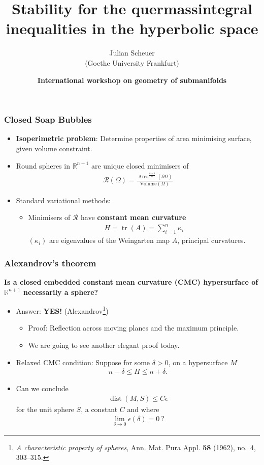 \documentclass{beamer}
\title[Stability for quermassintegrals]{Stability for the quermassintegral inequalities in the hyperbolic space}
\author[J. Scheuer]{Julian Scheuer\\ (Goethe University Frankfurt)
}
\date[Istanbul, 06/11/23]{{\bf{International workshop on geometry of submanifolds}}}
\newcommand{\bbR}{\mathbb{R}}
\newcommand{\8}{\infty}
\newcommand{\de}{\delta}
\newcommand{\ep}{\epsilon}
\newcommand{\ka}{\kappa}
\newcommand{\Om}{\Omega}
\newcommand{\cR}{\mathcal{R}}
\newcommand{\del}{\partial}
\newcommand{\fr}[2]{\frac{#1}{#2}}
\DeclareMathOperator{\dist}{dist}
\DeclareMathOperator{\tr}{tr}
\DeclareMathOperator{\Area}{Area}
\newcommand{\eq}[1]{\begin{equation}\begin{alignedat}{2} #1 \end{alignedat}\end{equation}}
\newcommand{\ra}{\rightarrow}
\newcommand{\mrm}{\mathrm}
\begin{document}
\maketitle



\begin{frame} 
\frametitle{Closed Soap Bubbles}

\begin{itemize}
		\item[] {\textbf{Isoperimetric problem}}: Determine properties of area minimising surface, given volume constraint. 
		\item[] Round spheres in $\bbR^{n+1}$ are unique closed minimisers of
		\eq{\cR(\Om) = \frac{\Area^{\fr{n+1}{n}}(\del\Om)}{\mrm{Volume}(\Om)}}
 	\item[] Standard variational methods:
	\begin{itemize}
	\item Minimisers of $\cR$ have {\bf{constant mean curvature}} 
	\eq{H=\tr(A) = \sum_{i=1}^{n}\ka_{i}}
	$(\ka_{i})$ are eigenvalues of the Weingarten map $A$, principal curvatures.
	\end{itemize}
\end{itemize}	
\end{frame}

\begin{frame} 
\frametitle{Alexandrov's theorem}

\begin{center}
{\textbf{Is a closed embedded constant mean curvature (CMC) hypersurface of $\bbR^{n+1}$ necessarily a sphere? }}
\end{center}


\begin{itemize}
\item[] Answer: {\textbf{YES!} (Alexandrov\footnote{\emph{A characteristic property of spheres}, Ann. Mat.
  Pura Appl. \textbf{58} (1962), no.~4, 303--315.})}
	\begin{itemize}
		\item Proof: Reflection across moving planes and the maximum principle.
		\item We are going to see another elegant proof today. 
	\end{itemize}
\item[] Relaxed CMC condition: Suppose for some $\de>0$, on a hypersurface $M$
\eq{n-\de\leq H\leq n+\de.}
\item[] Can we conclude
\eq{\dist(M,S)\leq C\ep}
for the unit sphere $S$, a constant $C$ and where 
\eq{\lim_{\de\ra 0}\ep(\de)= 0~?}
\end{itemize}
\end{frame}
\end{document}
